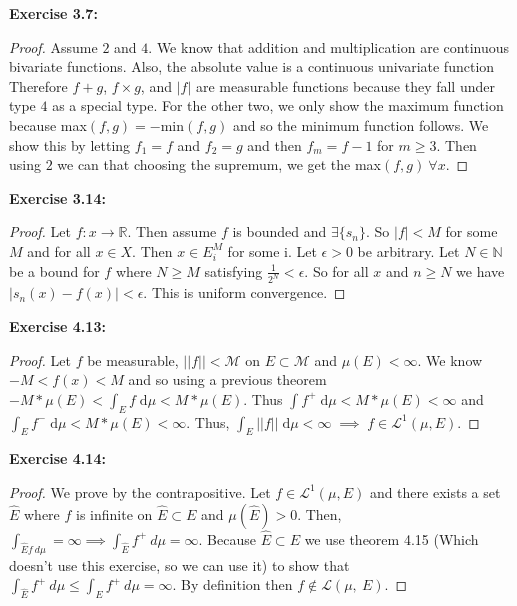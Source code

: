\documentclass[letterpaper,12pt]{article}
\theoremstyle{definition}
\begin{document}
\noindent\textbf{ Exercise 3.7:}
\begin{proof}
Assume $2$ and $4$.  We know that addition and multiplication are continuous  bivariate functions.  Also, the absolute value is a continuous univariate function Therefore $f + g$, $f \times g$, and $|f|$ are measurable functions because they fall under type $4$ as a special type.  For the other two, we only show the maximum function because max$(f, g) = -$min$(f, g)$ and so the minimum function follows.  We show this by letting $f_1 = f$ and $f_2 = g$ and then $f_m = f - 1$ for $m \geq 3$.  Then using $2$ we can that choosing the supremum, we get the max$(f \mathrm{, } g) \:\forall x$.  
\end{proof}

\noindent\textbf{ Exercise 3.14:}
\begin{proof}
Let $f : x \rightarrow \mathbb{R}$.  Then assume $f$ is bounded and $\exists \{s_n\}$.  So $|f| < M$ for some $M$ and for all $x \in X$. Then $x  \in E_i^M$ for some i.  Let $\epsilon > 0$ be arbitrary.  Let $N \in \mathbb{N}$ be a bound for $f$ where $N \geq M$ satisfying $\frac{1}{2^{N}} < \epsilon$.  So for all $x$ and $n \geq N$ we have $ | s_n(x) - f(x)| < \epsilon$. This is uniform convergence.
\end{proof}

\noindent\textbf{ Exercise 4.13: }
\begin{proof}
Let $f$ be measurable, $||f|| < \mathcal{M}$ on $E \subset \mathcal{M}$ and $\mu(E) < \infty$. We know $-M < f(x) < M$ and so using a previous theorem $-M*\mu(E) < \int_E f \; \mathrm{d}\mu < M*\mu(E)$.  Thus $\int f^+ \; \mathrm{d}\mu < M*\mu(E) < \infty$ and $\int_E f^- \; \mathrm{d}\mu < M*\mu(E) < \infty$.  Thus, $\int_E ||f||\; \mathrm{d}\mu < \infty\; \implies\; f \in \mathcal{L}^1(\mu, E)$.
\end{proof}

\noindent\textbf{ Exercise 4.14: }
\begin{proof}
We prove by the contrapositive.  Let $f \in \mathcal{L}^1(\mu\mathrm{, }E)$ and there exists a set $\hat{E}$ where $f$ is infinite on $\hat{E} \subset E$ and $\mu(\hat{E}) > 0$.  Then, $\int_{\hat{E} f \:d\mu} = \infty \implies \int_{\hat{E}} f^+\:d\mu = \infty$.  Because $\hat{E} \subset E$ we use theorem 4.15 (Which doesn't use this exercise, so we can use it) to show that  $\int_{\hat{E}} f^+\:d\mu \leq \int_{E} f^+\:d\mu = \infty$.  By definition then $f \notin \mathcal{L}(\mu,\: E)$.
\end{proof}
\end{document}
